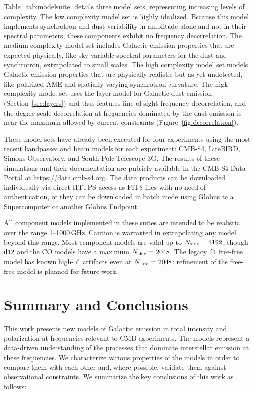 \documentclass[twocolumn]{aastex631}
\begin{document}
Table~\ref{tab:modelsuite} details three model sets, representing increasing levels of complexity. The low complexity model set is highly idealized. Because this model implements synchrotron and dust variability in amplitude alone and not in their spectral parameters, these components exhibit no frequency decorrelation. The medium complexity model set includes Galactic emission properties that are expected physically, like sky-variable spectral parameters for the dust and synchrotron, extrapolated to small scales. The high complexity model set models Galactic emission properties that are physically realistic but as-yet undetected, like polarized AME and spatially varying synchrotron curvature. The high complexity model set uses the layer model for Galactic dust emission (Section~\ref{sec:layers}) and thus features line-of-sight frequency decorrelation, and the degree-scale decorrelation at frequencies dominated by the dust emission is near the maximum allowed by current constraints (Figure~\ref{fig:decorrelation}).

These model sets have already been executed for four experiments using the most recent bandpasses and beam models for each experiment: CMB-S4, LiteBIRD, Simons Observatory, and South Pole Telescope 3G. The results of these simulations and their documentation are publicly available in the CMB-S4 Data Portal at \url{https://data.cmb-s4.org}. The data products can be downloaded individually via direct HTTPS access as FITS files with no need of authentication, or they can be downloaded in batch mode using Globus to a Supercomputer or another Globus Endpoint.

All component models implemented in these suites are intended to be realistic over the range 1--1000\,GHz. Caution is warranted in extrapolating any model beyond this range. Most component models are valid up to $N_{\rm side}=8192$, though \texttt{d12} and the CO models have a maximum $N_{\rm side}=2048$. The legacy \texttt{f1} free-free model has known high-$\ell$ artifacts even at $N_{\rm side} = 2048$: refinement of the free-free model is planned for future work.

\section{Summary and Conclusions} \label{sec:summary}

This work presents new models of Galactic emission in total intensity and polarization at frequencies relevant to CMB experiments. The models represent a data-driven understanding of the processes that dominate interstellar emission at these frequencies. We characterize various properties of the models in order to compare them with each other and, where possible, validate them against observational constraints. We summarize the key conclusions of this work as follows:
\end{document}
